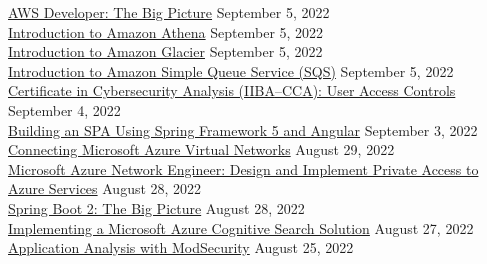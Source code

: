 \documentclass[10pt]{res} %
\begin{document}
\begin{resume}
\href{https://bjdelacruz.dev/files/certificates/pluralsight/1_AWS_Developer_The_Big_Picture.pdf}{\color{blue}AWS Developer: The Big Picture} \hfill September 5, 2022 \\
\href{https://bjdelacruz.dev/files/certificates/pluralsight/Introduction_to_Amazon_Athena.pdf}{\color{blue}Introduction to Amazon Athena} \hfill September 5, 2022 \\
\href{https://bjdelacruz.dev/files/certificates/pluralsight/Introduction_to_Amazon_Glacier.pdf}{\color{blue}Introduction to Amazon Glacier} \hfill September 5, 2022 \\
\href{https://bjdelacruz.dev/files/certificates/pluralsight/Introduction_to_Amazon_Simple_Queue_Service_SQS.pdf}{\color{blue}Introduction to Amazon Simple Queue Service (SQS)} \hfill September 5, 2022 \\
\href{https://bjdelacruz.dev/files/certificates/pluralsight/7_Certificate_in_Cybersecurity_Analysis_IIBA_CCA_User_Access_Controls.pdf}{\color{blue}Certificate in Cybersecurity Analysis (IIBA\textsuperscript{\textregistered}--CCA): User Access Controls} \hfill September 4, 2022 \\
\href{https://bjdelacruz.dev/files/certificates/pluralsight/Building_an_SPA_Using_Spring_Framework_5_and_Angular.pdf}{\color{blue}Building an SPA Using Spring Framework 5 and Angular} \hfill September 3, 2022 \\
\href{https://bjdelacruz.dev/files/certificates/pluralsight/2_Connecting_Microsoft_Azure_Virtual_Networks.pdf}{\color{blue}Connecting Microsoft Azure Virtual Networks} \hfill August 29, 2022 \\
\href{https://bjdelacruz.dev/files/certificates/pluralsight/5_Microsoft_Azure_Network_Engineer_Design_and_Implement_Private_Access_to_Azure_Services.pdf}{\color{blue}Microsoft Azure Network Engineer: Design and Implement Private Access to Azure Services} \hfill August 28, 2022 \\
\href{https://bjdelacruz.dev/files/certificates/pluralsight/Spring_Boot_2_The_Big_Picture.pdf}{\color{blue}Spring Boot 2: The Big Picture} \hfill August 28, 2022 \\
\href{https://bjdelacruz.dev/files/certificates/pluralsight/1_Implementing_a_Microsoft_Azure_Cognitive_Search_Solution.pdf}{\color{blue}Implementing a Microsoft Azure Cognitive Search Solution} \hfill August 27, 2022 \\
\href{https://bjdelacruz.dev/files/certificates/pluralsight/21_Application_Analysis_with_ModSecurity.pdf}{\color{blue}Application Analysis with ModSecurity} \hfill August 25, 2022 \\

\end{resume}
\end{document}
